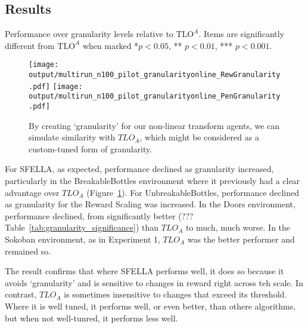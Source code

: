 \subsection{Results}



\begin{table}[t]
\footnotesize
  \caption{Performance over granularity levels relative to $\text{TLO}^A$. Items are significantly different from $\text{TLO}^A$ when marked *$p<0.05$, ** $p <0.01$, *** $p<0.001$.}
  \label{tab:granularity_significance}
\begin{adjustbox}{width=\columnwidth}

\end{adjustbox}
\end{table}


\begin{figure}
  \texttt{[image: output/multirun\_n100\_pilot\_granularityonline\_RewGranularity.pdf]}
  \texttt{[image: output/multirun\_n100\_pilot\_granularityonline\_PenGranularity.pdf]}
  \caption{By creating `granularity' for our non-linear transform agents, we can simulate similarity with $TLO_A$, which might be considered as a custom-tuned form of granularity.
  }
   \label{fig:exp3_main}
 \end{figure}
 
For SFELLA, as expected, performance declined as granularity increased, particularly in the BreakableBottles environment where it previously had a clear advantage over $TLO_A$ (Figure~\ref{fig:exp3_main}). For UnbreakableBottles, performance declined as granularity for the Reward Scaling was increased. In the Doors environment, performance declined, from significantly better (??? Table~\ref{tab:granularity_significance}) than $TLO_A$ to much, much worse. In the Sokoban environment, as in Experiment 1, $TLO_A$ was the better performer and remained so.

The result confirms that where SFELLA performs well, it does so because it avoids `granularity' and is sensitive to changes in reward right across teh scale. In contrast, $TLO_A$ is sometimes insensitive to changes that exceed its threshold. Where it is well tuned, it performs well, or even better, than othere algorithms, but when not well-tunred, it performs less well.



